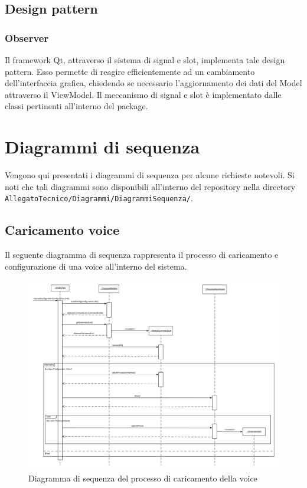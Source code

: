 \documentclass[openany,12pt,a4paper]{report}
\begin{document}
	\subsection{Design pattern}
	
	\subsubsection{Observer}
	Il framework Qt, attraverso il sistema di signal e slot, implementa tale design pattern. Esso permette di reagire efficientemente ad un cambiamento dell'interfaccia grafica, chiedendo se necessario l'aggiornamento dei dati del Model attraverso il ViewModel. Il meccanismo di signal e slot è implementato dalle classi pertinenti all'interno del package.  

	\newpage

	\section{Diagrammi di sequenza}
	
	Vengono qui presentati i diagrammi di sequenza per alcune richieste notevoli. Si noti che tali diagrammi sono disponibili all'interno del repository nella directory \verb|AllegatoTecnico/Diagrammi/DiagrammiSequenza/|.
	
	\subsection{Caricamento voice}
	
	Il seguente diagramma di sequenza rappresenta il processo di caricamento e configurazione di una voice all'interno del sistema. 
	
	\begin{figure}[H]
		\hspace*{-20mm}
		\includegraphics[scale=0.5]{CaricamentoVoice}
		\centering
		\caption{Diagramma di sequenza del processo di caricamento della voice}
	\end{figure}
	
\end{document}
